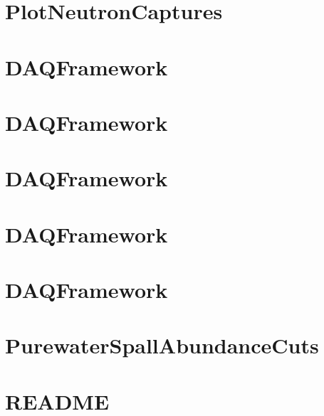 \let\mypdfximage\pdfximage\def\pdfximage{\immediate\mypdfximage}\documentclass[twoside]{book}
\newcommand{\+}{\discretionary{\mbox{\scriptsize$\hookleftarrow$}}{}{}}
\begin{document}
\chapter{Plot\+Neutron\+Captures}
\label{md_UserTools_PlotNeutronCaptures_README}

\chapter{DAQFramework}
\label{md_UserTools_PostLoweReconstructionCuts_README}

\chapter{DAQFramework}
\label{md_UserTools_PostReconstructionNeutronCloudSelection_README}

\chapter{DAQFramework}
\label{md_UserTools_PreLoweReconstructionCuts_README}

\chapter{DAQFramework}
\label{md_UserTools_PreReconstructionNeutronCloudSelection_README}

\chapter{DAQFramework}
\label{md_UserTools_PrintEvent_README}

\chapter{Purewater\+Spall\+Abundance\+Cuts}
\label{md_UserTools_PurewaterSpallAbundanceCuts_README}

\chapter{README}
\label{md_UserTools_ReadMCInfo_README}

\end{document}

